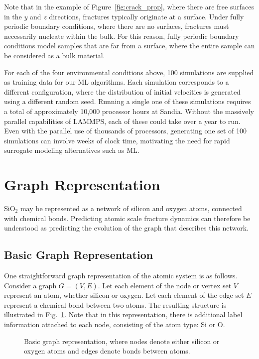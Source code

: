 \noindent
Note that in the example of Figure~\ref{fig:crack_prop}, where there are free surfaces in the $y$ and $z$ directions, fractures typically originate at a surface.  Under fully periodic boundary conditions, where there are no surfaces, fractures must necessarily nucleate within the bulk. For this reason, fully periodic boundary conditions model samples that are far from a surface, where the entire sample can be considered as a bulk material.

For each of the four environmental conditions above, 100 simulations are supplied as training data for our ML algorithms.  Each simulation corresponds to a different configuration, where the distribution of initial velocities is generated using a different random seed.  Running a single one of these simulations requires a total of approximately 10,000 processor hours at Sandia. Without the massively parallel capabilities of LAMMPS, each of these could take over a year to run.  Even with the parallel use of thousands of processors, generating one set of 100 simulations can involve weeks of clock time, motivating the need for rapid surrogate modeling alternatives such as ML.

\section{Graph Representation}
SiO$_2$ may be represented as a network of silicon and oxygen atoms, connected with chemical bonds.  Predicting atomic scale fracture dynamics can therefore be understood as predicting the evolution of the graph that describes this network.

\subsection{Basic Graph Representation}

One straightforward graph representation of the atomic system is as follows.  Consider a graph $G =(V,E)$.  Let each element of the node or vertex set $V$ represent an atom, whether silicon or oxygen.  Let each element of the edge set $E$ represent a chemical bond between two atoms.  The resulting structure is illustrated in Fig.~\ref{fig:basic_graph}.  Note that in this representation, there is additional label information attached to each node, consisting of the atom type: Si or O.

\begin{figure}
\centering
\noindent
\caption{Basic graph representation, where nodes denote either silicon or oxygen atoms and edges denote bonds between atoms.}
\label{fig:basic_graph}
\end{figure}

